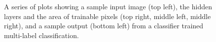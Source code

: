\documentclass[]{article}
\begin{document}
\begin{figure}
	\centering
	\caption{A series of plots showing a sample input image (top left), the hidden layers and the area of trainable pixels (top right, middle left, middle right), and a sample output (bottom left) from a classifier trained multi-label classification.}
\end{figure}
\end{document}
